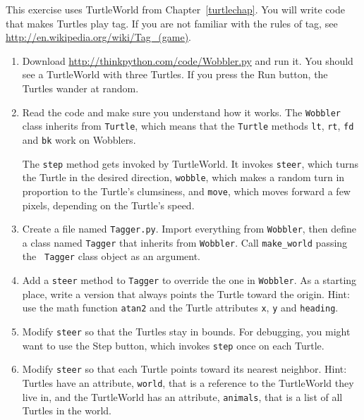 \documentclass[10pt]{book}
\begin{document}
\begin{exercise}

This exercise uses TurtleWorld from Chapter~\ref{turtlechap}.
You will write code that makes Turtles play tag.  If you
are not familiar with the rules of tag, see
\url{http://en.wikipedia.org/wiki/Tag_(game)}.

\begin{enumerate}

\item Download \url{http://thinkpython.com/code/Wobbler.py} and run it.  You
should see a TurtleWorld with three Turtles.  If you press the
{\sf Run} button, the Turtles wander at random.

\item Read the code and make sure you understand how it works.
The {\tt Wobbler} class inherits from {\tt Turtle}, which means
that the {\tt Turtle} methods {\tt lt}, {\tt rt}, {\tt fd}
and {\tt bk} work on Wobblers.

The {\tt step} method gets invoked by TurtleWorld.  It invokes
{\tt steer}, which turns the Turtle in the desired direction,
{\tt wobble}, which makes a random turn in proportion to the Turtle's
clumsiness, and {\tt move}, which moves forward a few pixels,
depending on the Turtle's speed.

\item Create a file named {\tt Tagger.py}.  Import everything from
  {\tt Wobbler}, then define a class named {\tt Tagger} that inherits
  from {\tt Wobbler}.  Call \verb"make_world" passing the {\tt
    Tagger} class object as an argument.

\item Add a {\tt steer} method to {\tt Tagger} to override the one in
  {\tt Wobbler}.  As a starting place, write a version that always
  points the Turtle toward the origin.  Hint: use the math function
  {\tt atan2} and the Turtle attributes {\tt x}, {\tt y} and
  {\tt heading}.

\item Modify {\tt steer} so that the Turtles stay in bounds.
  For debugging, you might want to use the {\sf Step} button,
  which invokes {\tt step} once on each Turtle.

\item Modify {\tt steer} so that each Turtle points toward its nearest
  neighbor.  Hint: Turtles have an attribute, {\tt world}, that is a
  reference to the TurtleWorld they live in, and the TurtleWorld has
  an attribute, {\tt animals}, that is a list of all Turtles in the
  world.


\end{enumerate}
\end{exercise}
\end{document}
